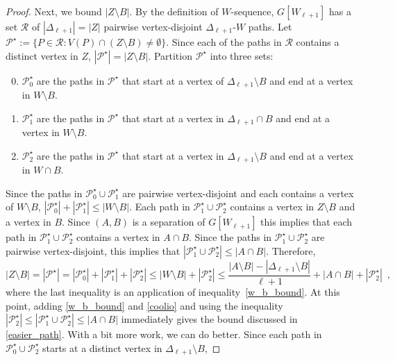 \documentclass{patmorin}
\newcommand{\pat}[1]{\textcolor{Blue}{[Pat: #1]}}
\begin{document}
\begin{proof}
Next, we bound $|Z\setminus B|$.  By the definition of $W$-sequence, $G[W_{\ell+1}]$ has a set $\mathcal{R}$ of $|\Delta_{\ell+1}|=|Z|$ pairwise vertex-disjoint $\Delta_{\ell+1}$-$W$ paths.  Let $\mathcal{P}^\star:=\{P\in\mathcal{R}: V(P)\cap (Z\setminus B)\neq\emptyset\}$.
Since each of the paths in $\mathcal{R}$ contains a distinct vertex in $Z$, $|\mathcal{P}^\star|=|Z\setminus B|$.  Partition $\mathcal{P}^\star$ into three sets:
  
  \begin{enumerate}\setcounter{enumi}{-1}
      \item $\mathcal{P}^\star_0$ are the paths in $\mathcal{P}^\star$ that start at a vertex of $\Delta_{\ell+1}\setminus B$ and end at a vertex in $W\setminus B$.
      \item $\mathcal{P}^\star_1$ are the paths in $\mathcal{P}^\star$ that start at a vertex in $\Delta_{\ell+1}\cap B$ and end at a vertex in $W\setminus B$.
      \item $\mathcal{P}^\star_2$ are the paths in $\mathcal{P}^\star$ that start at a vertex in $\Delta_{\ell+1}\setminus B$ and end at a vertex in $W\cap B$.
  \end{enumerate}
  Since the paths in $\mathcal{P}_0^\star\cup\mathcal{P}_1^\star$ are pairwise vertex-disjoint and each contains a vertex of $W\setminus B$, $|\mathcal{P}_0^\star|+|\mathcal{P}_1^\star|\le|W\setminus B|$.
  Each path in $\mathcal{P}_1^\star\cup \mathcal{P}_2^\star$ contains a vertex in $Z\setminus B$ and a vertex in $B$.  Since $(A,B)$ is a separation of $G[W_{\ell+1}]$ this implies that each path in $\mathcal{P}_1^\star\cup \mathcal{P}_2^\star$ contains a vertex in $A\cap B$. Since the paths in  $\mathcal{P}_1^\star\cup \mathcal{P}_2^\star$ are pairwise vertex-disjoint, this implies that $|\mathcal{P}_1^\star\cup \mathcal{P}_2^\star|\le |A\cap B|$. Therefore,
  \begin{equation}
     |Z\setminus B| = |\mathcal{P}^\star| = |\mathcal{P}_0^{\star}| + |\mathcal{P}_1^\star| + |\mathcal{P}_2^{\star}|
     \le |W\setminus B| + |\mathcal{P}_2^\star|
     \le \frac{|A\setminus B|-|\Delta_{\ell+1}\setminus B|}{\ell+1}+|A\cap B|+|\mathcal{P}_2^\star| 
     \enspace , \label{coolio}
  \end{equation}
  where the last inequality is an application of inequality~\eqref{w_b_bound}.  At this point, adding \eqref{w_b_bound} and \eqref{coolio} and using the inequality $|\mathcal{P}_2^\star| \le |\mathcal{P}_1^\star\cup\mathcal{P}_2^\star|\le |A\cap B|$ immediately gives the bound discussed in \cref{easier_path}.  With a bit more work, we can do better.  Since each path in $\mathcal{P}_0^\star\cup\mathcal{P}^\star_2$ starts at a distinct vertex in $\Delta_{\ell+1}\setminus B$, 

\end{proof}
\end{document}

